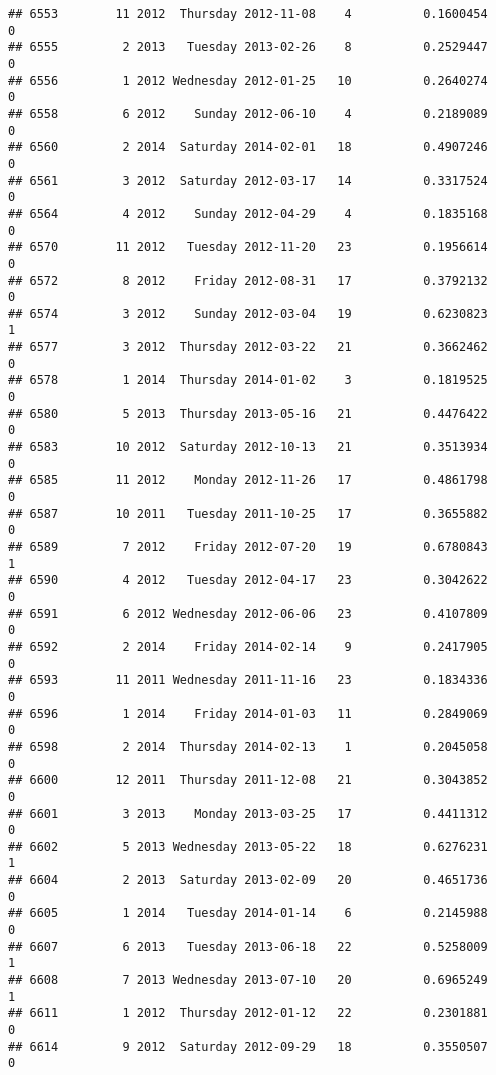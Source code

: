 \documentclass[
]{article}
\begin{document}
\begin{verbatim}
## 6553        11 2012  Thursday 2012-11-08    4          0.1600454             0
## 6555         2 2013   Tuesday 2013-02-26    8          0.2529447             0
## 6556         1 2012 Wednesday 2012-01-25   10          0.2640274             0
## 6558         6 2012    Sunday 2012-06-10    4          0.2189089             0
## 6560         2 2014  Saturday 2014-02-01   18          0.4907246             0
## 6561         3 2012  Saturday 2012-03-17   14          0.3317524             0
## 6564         4 2012    Sunday 2012-04-29    4          0.1835168             0
## 6570        11 2012   Tuesday 2012-11-20   23          0.1956614             0
## 6572         8 2012    Friday 2012-08-31   17          0.3792132             0
## 6574         3 2012    Sunday 2012-03-04   19          0.6230823             1
## 6577         3 2012  Thursday 2012-03-22   21          0.3662462             0
## 6578         1 2014  Thursday 2014-01-02    3          0.1819525             0
## 6580         5 2013  Thursday 2013-05-16   21          0.4476422             0
## 6583        10 2012  Saturday 2012-10-13   21          0.3513934             0
## 6585        11 2012    Monday 2012-11-26   17          0.4861798             0
## 6587        10 2011   Tuesday 2011-10-25   17          0.3655882             0
## 6589         7 2012    Friday 2012-07-20   19          0.6780843             1
## 6590         4 2012   Tuesday 2012-04-17   23          0.3042622             0
## 6591         6 2012 Wednesday 2012-06-06   23          0.4107809             0
## 6592         2 2014    Friday 2014-02-14    9          0.2417905             0
## 6593        11 2011 Wednesday 2011-11-16   23          0.1834336             0
## 6596         1 2014    Friday 2014-01-03   11          0.2849069             0
## 6598         2 2014  Thursday 2014-02-13    1          0.2045058             0
## 6600        12 2011  Thursday 2011-12-08   21          0.3043852             0
## 6601         3 2013    Monday 2013-03-25   17          0.4411312             0
## 6602         5 2013 Wednesday 2013-05-22   18          0.6276231             1
## 6604         2 2013  Saturday 2013-02-09   20          0.4651736             0
## 6605         1 2014   Tuesday 2014-01-14    6          0.2145988             0
## 6607         6 2013   Tuesday 2013-06-18   22          0.5258009             1
## 6608         7 2013 Wednesday 2013-07-10   20          0.6965249             1
## 6611         1 2012  Thursday 2012-01-12   22          0.2301881             0
## 6614         9 2012  Saturday 2012-09-29   18          0.3550507             0

\end{verbatim}
\end{document}
